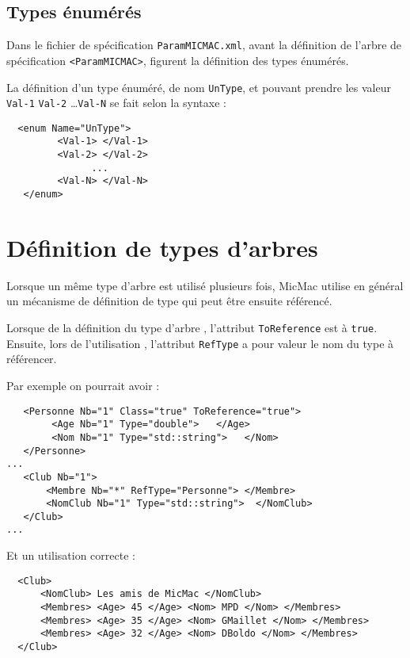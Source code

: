 \subsection{Types \'enum\'er\'es}

Dans le fichier de sp\'ecification {\tt ParamMICMAC.xml},
avant la d\'efinition de l'arbre de sp\'ecification {\tt <ParamMICMAC>},
figurent la d\'efinition des types  \'enum\'er\'es.

La d\'efinition d'un type \'enum\'er\'e, de nom {\tt UnType}, et
pouvant prendre les valeur  {\tt Val-1} {\tt Val-2} \dots {\tt Val-N}
se fait selon la syntaxe :

\begin{verbatim}
  <enum Name="UnType">
         <Val-1> </Val-1>
         <Val-2> </Val-2>
               ...
         <Val-N> </Val-N>
   </enum>

\end{verbatim}


\section{D\'efinition de types d'arbres}

\label{Def:Type:Arbre}

Lorsque un m\^eme type d'arbre est utilis\'e plusieurs fois,
MicMac utilise en g\'en\'eral un m\'ecanisme de d\'efinition
de type qui peut \^etre ensuite r\'ef\'erenc\'e.

Lorsque de la   d\'efinition du type d'arbre , l'attribut {\tt ToReference}
est \`a {\tt true}. Ensuite, lors de l'utilisation ,
l'attribut {\tt RefType} a pour valeur le nom du
type \`a r\'ef\'erencer.

Par exemple on pourrait avoir :

\begin{verbatim}
   <Personne Nb="1" Class="true" ToReference="true">
        <Age Nb="1" Type="double">   </Age>
        <Nom Nb="1" Type="std::string">   </Nom>
   </Personne>
...
   <Club Nb="1">
       <Membre Nb="*" RefType="Personne"> </Membre>
       <NomClub Nb="1" Type="std::string">  </NomClub>
   </Club>
...
\end{verbatim}

Et un utilisation correcte :

\begin{verbatim}
  <Club>
      <NomClub> Les amis de MicMac </NomClub>
      <Membres> <Age> 45 </Age> <Nom> MPD </Nom> </Membres>
      <Membres> <Age> 35 </Age> <Nom> GMaillet </Nom> </Membres>
      <Membres> <Age> 32 </Age> <Nom> DBoldo </Nom> </Membres>
  </Club>
\end{verbatim}

